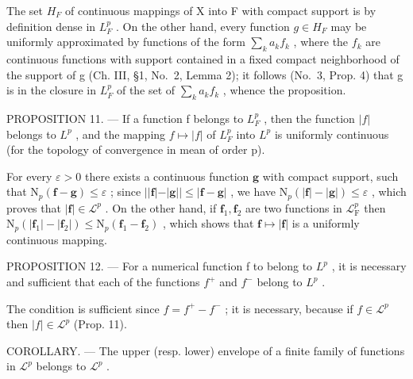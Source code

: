 The set \(H_{F}\) of continuous mappings of X into F with compact support is by definition dense in \(L_{F}^{p}\) . On the other hand, every function \(g \in H_{F}\) may be uniformly approximated by functions of the form \(\sum_{k} a_{k} f_{k}\) , where the \(f_{k}\) are continuous functions with support contained in a fixed compact neighborhood of the support of g (Ch. III, §1, No.~2, Lemma 2); it follows (No.~3, Prop. 4) that g is in the closure in \(L_{F}^{p}\) of the set of \(\sum_{k} a_{k} f_{k}\) , whence the proposition.

PROPOSITION 11. --- If a function f belongs to \(L_{F}^{p}\) , then the function \(|f|\) belongs to \(L^{p}\) , and the mapping \(f \mapsto |f|\) of \(L_{F}^{p}\) into \(L^{p}\) is uniformly continuous (for the topology of convergence in mean of order p).

For every \(\varepsilon > 0\) there exists a continuous function \(\mathbf{g}\) with compact support, such that \(\mathrm{N}_p(\mathbf{f} - \mathbf{g}) \leqslant \varepsilon\) ; since \(||\mathbf{f}| - |\mathbf{g}|| \leqslant |\mathbf{f} - \mathbf{g}|\) , we have \(\mathrm{N}_p(|\mathbf{f}| - |\mathbf{g}|) \leqslant \varepsilon\) , which proves that \(|\mathbf{f}| \in \mathcal{L}^p\) . On the other hand, if \(\mathbf{f}_1, \mathbf{f}_2\) are two functions in \(\mathcal{L}_{\mathrm{F}}^p\) then \(\mathrm{N}_p(|\mathbf{f}_1| - |\mathbf{f}_2|) \leqslant \mathrm{N}_p(\mathbf{f}_1 - \mathbf{f}_2)\) , which shows that \(\mathbf{f} \mapsto |\mathbf{f}|\) is a uniformly continuous mapping.

PROPOSITION 12. --- For a numerical function f to belong to \(L^{p}\) , it is necessary and sufficient that each of the functions \(f^{+}\) and \(f^{-}\) belong to \(L^{p}\) .

The condition is sufficient since \(f = f^{+} - f^{-}\) ; it is necessary, because if \(f \in \mathcal{L}^p\) then \(|f| \in \mathcal{L}^p\) (Prop. 11).

COROLLARY. --- The upper (resp. lower) envelope of a finite family of functions in \(\mathcal{L}^{p}\) belongs to \(\mathcal{L}^{p}\) .

